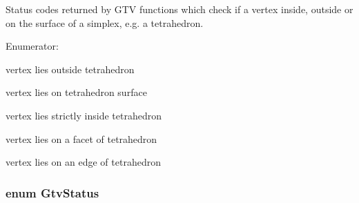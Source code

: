 Status codes returned by GTV functions which check if a vertex inside, outside or on the surface of a simplex, e.g. a tetrahedron. \begin{Desc}
\item[Enumerator: ]\par
\begin{description}
\item[{\em 
GTV\_\-ON\label{group__status_ggb1a7c0fd996feb29fd2412deb08ff5736a8fd3e68363fb62392bc22ca76a0f8c}
}]vertex lies outside tetrahedron \item[{\em 
GTV\_\-IN\label{group__status_ggb1a7c0fd996feb29fd2412deb08ff573ba23b5b7151d8eee3ce6b251a0d90cd1}
}]vertex lies on tetrahedron surface \item[{\em 
GTV\_\-ON\_\-FACET\label{group__status_ggb1a7c0fd996feb29fd2412deb08ff5737dcd577dd01f7de220eccfc92704ce22}
}]vertex lies strictly inside tetrahedron \item[{\em 
GTV\_\-ON\_\-EDGE\label{group__status_ggb1a7c0fd996feb29fd2412deb08ff573f4bb77bc3b387349720f91b338c8cc41}
}]vertex lies on a facet of tetrahedron \item[{\em 
GTV\_\-ON\_\-VERTEX\label{group__status_ggb1a7c0fd996feb29fd2412deb08ff5731a1783e49d5482d45376295e4701efbd}
}]vertex lies on an edge of tetrahedron \end{description}
\end{Desc}

\subsubsection{\setlength{\rightskip}{0pt plus 5cm}enum {\bf GtvStatus}}\label{group__status_gfb23c4ddc35e1ea652487a43f9a0f8a9}


